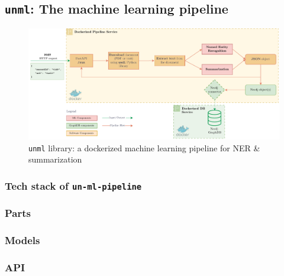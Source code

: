 
\subsection{\texttt{unml}: The machine learning pipeline} \label{ssec:unml-the-machine-learning-pipeline}

\begin{figure}[!htb]
    \centering

    \includegraphics[width=\textwidth]{res/ml-pipeline.pdf}
    \caption{\texttt{unml} library: a dockerized machine learning pipeline for NER \& summarization}

    \label{fig:ml-pipeline}
\end{figure}

\subsubsection*{Tech stack of \texttt{un-ml-pipeline}} \label{sssec:tech-stack-of-un-ml-pipeline}

\subsubsection{Parts} \label{sssec:parts}


\subsubsection{Models} \label{sssec:models}

\subsubsection{API} \label{sssec:api}


